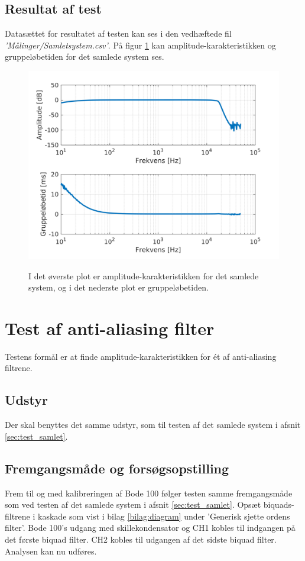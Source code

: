 \subsection{Resultat af test}
Datasættet for resultatet af testen kan ses i den vedhæftede fil \textit{'Målinger/Samlet\textunderscore system.csv'}. På figur \ref{fig:tf_tg_samletsystem} kan amplitude-karakteristikken og gruppeløbetiden for det samlede system ses.
\begin{figure}[h]
	\caption{I det øverste plot er amplitude-karakteristikken for det samlede system, og i det nederste plot er gruppeløbetiden.}
	\includegraphics[width=1\linewidth]{matlab/tf_tg_samletsystem.png}
	\label{fig:tf_tg_samletsystem}
\end{figure}

\section{Test af anti-aliasing filter}
\label{sec:test_aafilter}
Testens formål er at finde amplitude-karakteristikken for ét af anti-aliasing filtrene. 

\subsection{Udstyr}
Der skal benyttes det samme udstyr, som til testen af det samlede system i afsnit \ref{sec:test_samlet}.

\subsection{Fremgangsmåde og forsøgsopstilling}
Frem til og med kalibreringen af Bode 100 følger testen samme fremgangsmåde som ved testen af det samlede system i afsnit \ref{sec:test_samlet}. \newline
Opsæt biquads-filtrene i kaskade som vist i bilag \ref{bilag:diagram} under 'Generisk sjette ordens filter'. 
Bode 100's udgang med skillekondensator og CH1 kobles til indgangen på det første biquad filter. 
CH2 kobles til udgangen af det sidste biquad filter. \newline
Analysen kan nu udføres. 

